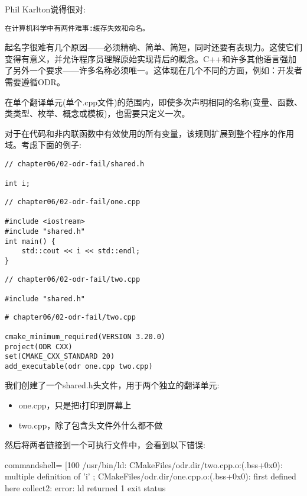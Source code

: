 
Phil Karlton说得很对:

\texttt{在计算机科学中有两件难事:缓存失效和命名。}

起名字很难有几个原因——必须精确、简单、简短，同时还要有表现力。这使它们变得有意义，并允许程序员理解原始实现背后的概念。C++和许多其他语言强加了另外一个要求——许多名称必须唯一。这体现在几个不同的方面，例如：开发者需要遵循ODR。

在单个翻译单元(单个.cpp文件)的范围内，即使多次声明相同的名称(变量、函数、类类型、枚举、概念或模板)，也需要只定义一次。

对于在代码和非内联函数中有效使用的所有变量，该规则扩展到整个程序的作用域。考虑下面的例子:

\begin{lstlisting}[style=styleCXX]
// chapter06/02-odr-fail/shared.h

int i;
\end{lstlisting}

\begin{lstlisting}[style=styleCXX]
// chapter06/02-odr-fail/one.cpp

#include <iostream>
#include "shared.h"
int main() {
	std::cout << i << std::endl;
}
\end{lstlisting}

\begin{lstlisting}[style=styleCXX]
// chapter06/02-odr-fail/two.cpp
	
#include "shared.h"
\end{lstlisting}

\begin{lstlisting}[style=styleCMake]
# chapter06/02-odr-fail/two.cpp
	
cmake_minimum_required(VERSION 3.20.0)
project(ODR CXX)
set(CMAKE_CXX_STANDARD 20)
add_executable(odr one.cpp two.cpp)
\end{lstlisting}

我们创建了一个shared.h头文件，用于两个独立的翻译单元:

\begin{itemize}
\item 
one.cpp，只是把i打印到屏幕上

\item 
two.cpp，除了包含头文件外什么都不做
\end{itemize}

然后将两者链接到一个可执行文件中，会看到以下错误:

\begin{tcblisting}{commandshell={}}
[100%
/usr/bin/ld: CMakeFiles/odr.dir/two.cpp.o:(.bss+0x0): multiple
definition of 'i'
; CMakeFiles/odr.dir/one.cpp.o:(.bss+0x0): first defined here
collect2: error: ld returned 1 exit status
\end{tcblisting}

